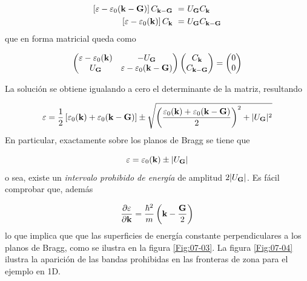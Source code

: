 \begin{equation}
    \begin{split}
    \left[ \varepsilon-\varepsilon_0 (\mathbf{k} - \mathbf{G}) \right] C_{\mathbf{k}-\mathbf{G}} \ = & \ U_{\mathbf{G}} C_{\mathbf{k}} \\
    \left[ \varepsilon-\varepsilon_0 (\mathbf{k}) \right] C_{\mathbf{k}} \ = & \ U_{\mathbf{G}} C_{\mathbf{k}-\mathbf{G}}
    \end{split} \label{Ec:07-04-08}
\end{equation}
que en forma matricial queda como

\begin{equation}
\begin{pmatrix}
\varepsilon - \varepsilon_0 (\mathbf{k}) & - U_{\mathbf{G}} \\
U_{\mathbf{G}} & \varepsilon - \varepsilon_0 (\mathbf{k} - \mathbf{G})
\end{pmatrix} \begin{pmatrix}
C_{\mathbf{k}} \\
C_{\mathbf{k} - \mathbf{G}}
\end{pmatrix} = 
\begin{pmatrix}
0 \\
0
\end{pmatrix}
\end{equation}

La solución se obtiene igualando a cero el determinante de la matriz, resultando

\begin{equation}
    \varepsilon = \frac{1}{2} \left[ \varepsilon_0 (\mathbf{k}) + \varepsilon_0 (\mathbf{k} - \mathbf{G}) \right] \pm \sqrt{\left( \dfrac{\varepsilon_0 (\mathbf{k}) + \varepsilon_0 (\mathbf{k} - \mathbf{G})}{2} \right)^2 + |U_{\mathbf{G}}|^2}
\end{equation}
En particular, exactamente sobre los planos de Bragg se tiene que

\begin{equation}
    \varepsilon = \varepsilon_0 (\mathbf{k}) \pm |U_{\mathbf{G}} | \label{Ec:07-04-11}
\end{equation}
o sea, existe un \textit{intervalo prohibido de energía} de amplitud $2|U_{\mathbf{G}}|$. Es fácil comprobar que, además 

\begin{equation}
    \frac{\partial \varepsilon}{\partial \mathbf{k}} = \frac{\hbar^2}{m} \left( \mathbf{k} - \frac{\mathbf{G}}{2} \right)
\end{equation}
lo que implica que que las superficies de energía constante perpendiculares a los planos de Bragg, como se ilustra en la figura \ref{Fig:07-03}. La figura \ref{Fig:07-04} ilustra la aparición de las bandas prohibidas en las fronteras de zona para el ejemplo en 1D.

